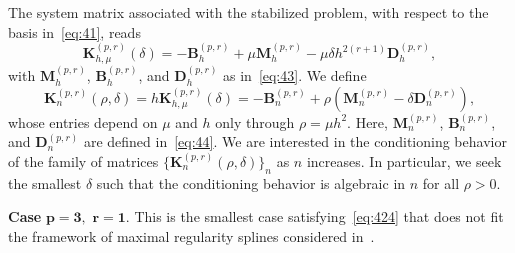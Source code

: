 \documentclass[addpoints,12pt,letter]{article}
\newcommand{\de}{\delta}
\numberwithin{equation}{section}
\theoremstyle{definition}
\begin{document}
The system matrix associated with the stabilized problem, with respect to the basis in~\eqref{eq:41}, reads
\[
\mathbf{K}^{(p,r)}_{h,\mu}(\de)=-\mathbf{B}_{h}^{(p,r)}+\mu\mathbf{M}_{h}^{(p,r)}-\mu\de h^{2(r+1)}\mathbf{D}_{h}^{(p,r)},
\]
with $\mathbf{M}_{h}^{(p,r)}$, $\mathbf{B}_{h}^{(p,r)}$, and $\mathbf{D}_{h}^{(p,r)}$ as in~\eqref{eq:43}.
We define
\begin{equation} \label{eq:524b}
\mathbf{K}_{n}^{(p,r)}(\rho,\de)=h\mathbf{K}_{h,\mu}^{(p,r)}(\de)=-\mathbf{B}_{n}^{(p,r)}+\rho (\mathbf{M}_{n}^{(p,r)}-\de\mathbf{D}_{n}^{(p,r)}),
\end{equation}
whose entries depend on $\mu$ and $h$ only through $\rho=\mu h^{2}$.
Here, $\mathbf{M}_{n}^{(p,r)}$, $\mathbf{B}_{n}^{(p,r)}$, and $\mathbf{D}_{n}^{(p,r)}$ are defined in~\eqref{eq:44}.
We are interested in the conditioning behavior of the family of matrices $\{\mathbf{K}_{n}^{(p,r)}(\rho,\de)\}_{n}$ as $n$ increases.
In particular, we seek the smallest $\de$ such that the conditioning behavior is algebraic in $n$ for all $\rho> 0$.

\medskip
\noindent
\textbf{Case} $\boldsymbol{p=3,}$ $\boldsymbol{r=1.}$
This is the smallest case satisfying~\eqref{eq:424} that does not fit the framework of maximal regularity splines considered in~\cite{FeFr26}.
\end{document}
